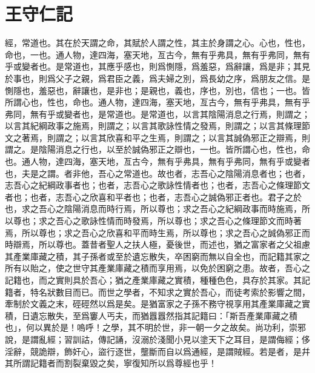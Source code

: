 \section[尊經閣記\quad{\small 王守仁}]{{\normalsize 王守仁}\quad {}記}
經，常道也。其在於天謂之命，其賦於人謂之性，其主於身謂之心。心也，性也，命也，一也。通人物，達四海，塞天地，亙古今，無有乎弗具，無有乎弗同，無有乎或變者也。是常道也，其應乎感也，則爲惻隱，爲羞惡，爲辭讓，爲是非；其見於事也，則爲父子之親，爲君臣之義，爲夫婦之別，爲長幼之序，爲朋友之信。是惻隱也，羞惡也，辭讓也，是非也；是親也，義也，序也，別也，信也；{一也}。皆所謂心也，性也，命也。通人物，達四海，塞天地，亙古今，無有乎弗具，無有乎弗同，無有乎或變者也，是常道也。{是常道也}，以言其陰陽消息之行焉，則謂之；以言其紀綱政事之施焉，則謂之；以言其歌詠性情之發焉，則謂之；以言其條理節文之著焉，則謂之；以言其欣喜和平之生焉，則謂之；以言其誠偽邪正之辯焉，則謂之。是陰陽消息之行也，以至於誠偽邪正之辯也，一也。皆所謂心也，性也，命也。通人物，達四海，塞天地，亙古今，無有乎弗具，無有乎弗同，無有乎或變者也，夫是之謂。者非他，吾心之常道也。故也者，志吾心之陰陽消息者也；也者，志吾心之紀綱政事者也；也者，志吾心之歌詠性情者也；也者，志吾心之條理節文者也；也者，志吾心之欣喜和平者也；也者，志吾心之誠偽邪正者也。君子之於也，求之吾心之陰陽消息而時行焉，所以尊也；求之吾心之紀綱政事而時施焉，所以尊也；求之吾心之歌詠性情而時發焉，所以尊也；求之吾心之條理節文而時著焉，所以尊也；求之吾心之欣喜和平而時生焉，所以尊也；求之吾心之誠偽邪正而時辯焉，所以尊也。蓋昔{者}聖人之扶人極，憂後世，而述也，猶之富家者之父祖慮其產業庫藏之積，其子孫者或至於遺{忘}散失，卒困窮而無以自全也，而記籍其家之所有以貽之，使之世守其產業庫藏之積而享用焉，以免於困窮之患。故者，吾心之記籍也，而之實則具於吾心；猶之產業庫藏之實積，種種色色，具存於其家。其記籍者，特名狀數目而已。而世之學者，不知求之實於吾心，而徒考索於影響之間，牽制於文義之末，硜硜然以爲是矣。是猶富家之子孫不務守視享用其產業庫藏之實積，日遺{忘}散失，至爲窶人丐夫，而猶囂囂然指其記籍曰：「斯吾產業庫藏之積也」，何以異於是！嗚呼！之學，其不明於世，非一朝一夕之故矣。尚功利，崇邪說，是謂亂經；習訓詁，傳記誦，沒溺於淺聞小見以塗天下之耳目，是謂侮經；侈淫辭，競詭辯，飾奸心，盜行逐世，壟斷而自以爲通經，是謂賊經。若是者，是幷其所謂記籍者而割裂棄毀之矣，寧復知所以爲尊經也乎！%

